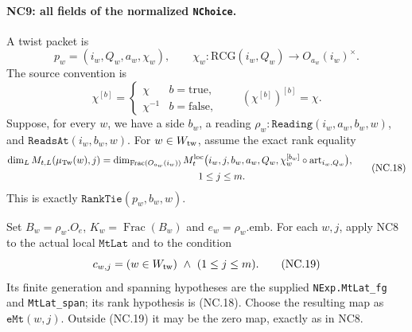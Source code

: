 \paragraph{NC9: all fields of the normalized \texttt{NChoice}.}
A twist packet is
\[
 p_w=(i_w,Q_w,a_w,\chi_w),\qquad
 \chi_w:\mathrm{RCG}(i_w,Q_w)\longrightarrow O_{a_w}(i_w)^\times.
\]
The source convention is
\[
 \chi^{[b]}=
 \begin{cases}\chi&b=\mathrm{true},\\
                \chi^{-1}&b=\mathrm{false},
 \end{cases}
 \qquad(\chi^{[b]})^{[b]}=\chi.
 \tag{NC.17}
\]
Suppose, for every \(w\), we have a side \(b_w\), a reading
\(\rho_w:\texttt{Reading}(i_w,a_w,b_w,w)\), and
\(\texttt{ReadsAt}(i_w,b_w,w)\).
For \(w\in W_{\rm tw}\), assume the exact rank equality
\[
 \begin{split}
 \dim_L M_{t,L}(\mu_{\rm Tw}(w),j)
 &=
 \dim_{\operatorname{Frac}(O_{a_w}(i_w))}
 M_t^{\rm loc}\bigl(i_w,j,b_w,a_w,Q_w,
                 \chi_w^{[b_w]}\circ\operatorname{art}_{i_w,Q_w}\bigr),
 \\
 &\hspace{100pt}1\leq j\leq m.
 \end{split}
 \tag{NC.18}
\]
This is exactly \(\texttt{RankTie}(p_w,b_w,w)\).

Set \(B_w=\rho_w.O_e\), \(K_w=\operatorname{Frac}(B_w)\)
and \(e_w=\rho_w.\mathrm{emb}\).
For each \(w,j\), apply NC8 to the actual local
\(\texttt{MtLat}\) and to the condition
\[
 c_{w,j}=(w\in W_{\rm tw})\ \wedge\ (1\leq j\leq m).
 \tag{NC.19}
\]
Its finite generation and spanning hypotheses are the supplied
\texttt{NExp.MtLat\_fg} and \texttt{MtLat\_span}; its rank
hypothesis is (NC.18). Choose the resulting map as
\(\texttt{eMt}(w,j)\).
Outside (NC.19) it may be the zero map, exactly as in NC8.

